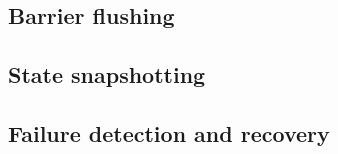 


\subsection{Barrier flushing}


\subsection{State snapshotting}

\subsection{Failure detection and recovery}



